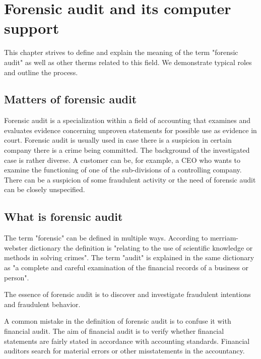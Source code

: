 \chapter{Forensic audit and its computer support}




This chapter strives to define and explain the meaning of the term "forensic audit" as well as other therms related to this field. We demonstrate typical roles and outline the process.

\section{Matters of forensic audit}
Forensic audit is a specialization within a field of accounting that examines and evaluates evidence concerning unproven statements for possible use as evidence in court. Forensic audit is usually used in case there is a suspicion in certain company there is a crime being committed. The background of the investigated case is rather diverse. A customer can be, for example, a CEO  who wants to examine the functioning of one of the sub-divisions of a controlling company. There can be a suspicion of some fraudulent activity or the need of forensic audit can be closely unspecified.

\section{What is forensic audit}
The term "forensic" can be defined in multiple ways. According to merriam-webster dictionary  the definition is "relating to the use of scientific knowledge or methods in solving crimes". The term "audit" is explained in the same dictionary as "a complete and careful examination of the financial records of a business or person". 

The essence of forensic audit is to discover and investigate fraudulent intentions and fraudulent behavior. 

A common mistake in the definition of forensic audit is to confuse it with financial audit. The aim of financial audit is to verify whether financial statements are fairly stated in accordance with accounting standards. Financial auditors search for material errors or other misstatements in the accountancy.

